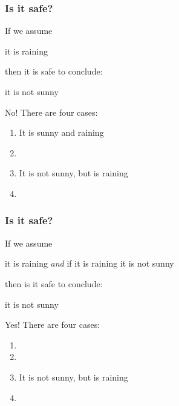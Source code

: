 \documentclass[xetex,aspectratio=169,14pt,hyperref={pdfpagelabels=true,pdflang={en-GB}}]{beamer}
\begin{document}
\begin{frame}[t]
  \frametitle{Is it safe?}

  If we assume
  \begin{center}
    it is raining
  \end{center}
  then it is safe to conclude:
  \begin{center}
    it is not sunny
  \end{center}

  \bigskip
  \pause

  No! \pause There are four cases:
  \begin{enumerate}
  \item It is sunny and raining
  \item {}
  \item It is not sunny, but is raining
  \item {}
  \end{enumerate}
  \pause %
\end{frame}

\begin{frame}[t]
  \frametitle{Is it safe?}

  If we assume
  \begin{center}
    it is raining \qquad \emph{and} \qquad if it is raining it is not sunny
  \end{center}
  then is it safe to conclude:
  \begin{center}
    it is not sunny
  \end{center}

  \bigskip
  \pause

  Yes! \pause There are four cases:
  \begin{enumerate}
  \item {}
  \item {}
  \item It is not sunny, but is raining
  \item {}
  \end{enumerate}
  \pause %
\end{frame}
\end{document}
